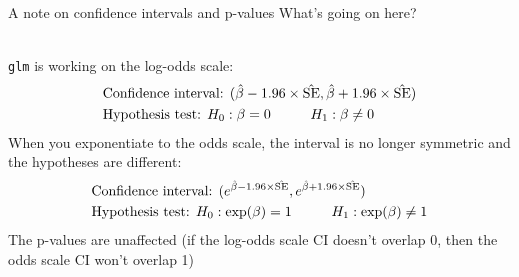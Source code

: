 \documentclass[10pt,t]{beamer}
\newcommand\tab[1][1cm]{\hspace*{#1}}
\begin{document}
\begin{frame}{A note on confidence intervals and p-values}
	What's going on here? 
	\\ ~\
	
	\texttt{glm} is working on the log-odds scale:
	\begin{align*}
		&\text{Confidence interval: }(\hat{\beta} - 1.96 \times \hat{\text{SE}}, \hat{\beta} + 1.96 \times \hat{\text{SE}})\\
		&\text{Hypothesis test: }H_0: \beta = 0 \tab H_1: \beta \neq 0
	\end{align*}
	When you exponentiate to the odds scale, the interval is no longer symmetric and the hypotheses are different:
	\begin{align*}
		&\text{Confidence interval: }(e^{\hat{\beta} - 1.96 \times \hat{\text{SE}}}, e^{\hat{\beta} + 1.96 \times \hat{\text{SE}}})\\
		&\text{Hypothesis test: }H_0: \exp(\beta) = 1 \tab H_1: \exp(\beta) \neq 1
	\end{align*} 
	The p-values are unaffected (if the log-odds scale CI doesn't overlap 0, then the odds scale CI won't overlap 1)
\end{frame}
\end{document}
